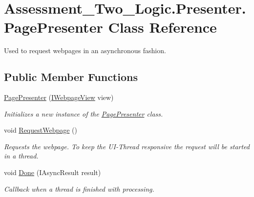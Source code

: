 \hypertarget{class_assessment___two___logic_1_1_presenter_1_1_page_presenter}{
\section{Assessment\_\-Two\_\-Logic.Presenter.PagePresenter Class Reference}
\label{class_assessment___two___logic_1_1_presenter_1_1_page_presenter}
}


Used to request webpages in an asynchronous fashion.  


\subsection*{Public Member Functions}
\begin{DoxyCompactItemize}
\item 
\hyperlink{class_assessment___two___logic_1_1_presenter_1_1_page_presenter_a50bcae7edfc3e27e9f1f990b799f58b2}{PagePresenter} (\hyperlink{interface_assessment___two___logic_1_1_interfaces_1_1_i_webpage_view}{IWebpageView} view)
\begin{DoxyCompactList}\small\item\em Initializes a new instance of the \hyperlink{class_assessment___two___logic_1_1_presenter_1_1_page_presenter}{PagePresenter} class. \item\end{DoxyCompactList}\item 
void \hyperlink{class_assessment___two___logic_1_1_presenter_1_1_page_presenter_a01747034352ec4a8b92c892f99bec18d}{RequestWebpage} ()
\begin{DoxyCompactList}\small\item\em Requests the webpage. To keep the UI-\/Thread responsive the request will be started in a thread. \item\end{DoxyCompactList}\item 
void \hyperlink{class_assessment___two___logic_1_1_presenter_1_1_page_presenter_ac6e2cb8b041a8496fcf48c3d268c026b}{Done} (IAsyncResult result)
\begin{DoxyCompactList}\small\item\em Callback when a thread is finished with processing. \item\end{DoxyCompactList}\end{DoxyCompactItemize}


